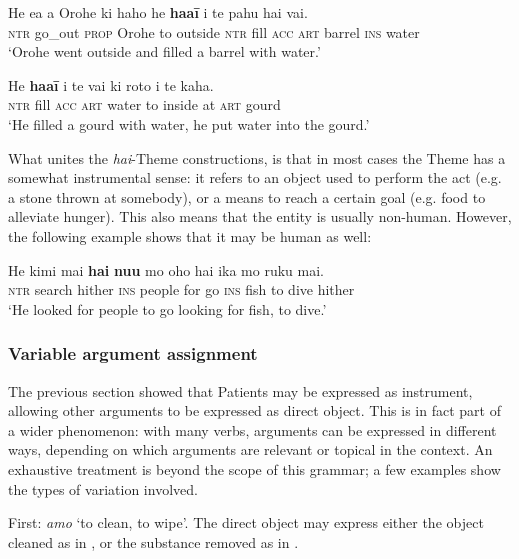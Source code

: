 \ea\label{ex:8.138}
\gll He e{\ꞌ}a a {\ꞌ}Orohe ki haho he \textbf{ha{\ꞌ}a{\ꞌ}ī} i te pahu hai vai. \\
\textsc{ntr} go\_out \textsc{prop} Orohe to outside \textsc{ntr} fill \textsc{acc} \textsc{art} barrel \textsc{ins} water \\

\glt 
‘Orohe went outside and filled a barrel with water.’ \textstyleExampleref{[R169.002]} 
\z

\ea\label{ex:8.139}
\gll He \textbf{ha{\ꞌ}a{\ꞌ}ī} i te vai ki roto i te kaha. \\
\textsc{ntr} fill \textsc{acc} \textsc{art} water to inside at \textsc{art} gourd \\

\glt 
‘He filled a gourd with water, he put water into the gourd.’ \textstyleExampleref{[Fel-97.035]}\textstyleExampleref{} 
\z

What unites the \textit{hai}{}-Theme constructions, is that in most cases the Theme has a somewhat instrumental sense: it refers to an object used to perform the act (e.g. a stone thrown at somebody), or a means to reach a certain goal (e.g. food to alleviate hunger). This also means that the entity is usually non-human. However, the following example shows that it may be human as well:

\ea\label{ex:8.140}
\gll He kimi mai \textbf{hai} \textbf{nu{\ꞌ}u} mo oho hai ika mo ruku mai. \\
\textsc{ntr} search hither \textsc{ins} people for go \textsc{ins} fish to dive hither \\

\glt 
‘He looked for people to go looking for fish, to dive.’ \textstyleExampleref{[R309.100]} 
\z
{}
\subsubsection{Variable argument assignment}\label{sec:8.6.4.4}

The previous section showed that Patients may be expressed as instrument, allowing other arguments to be expressed as direct object. This is in fact part of a wider phenomenon: with many verbs, arguments can be expressed in different ways, depending on which arguments are relevant or topical in the context. An exhaustive treatment is beyond the scope of this grammar; a few examples show the types of variation involved.

First: \textit{amo} ‘to clean, to wipe’. The direct object may express either the object cleaned as in , or the substance removed as in .

